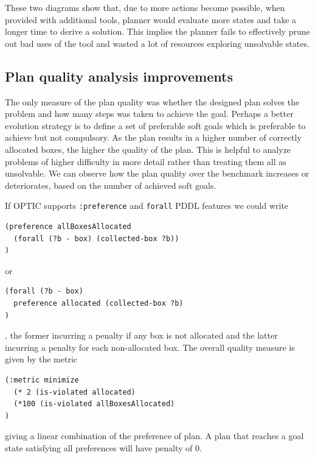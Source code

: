\documentclass[letterpaper]{article} %
\begin{document}
These two diagrams show that, due to more actions become possible, 
when provided with additional tools, planner would evaluate more 
states and take a longer time to derive a solution. This implies 
the planner fails to effectively prune out bad uses of the tool and 
wasted a lot of resources exploring unsolvable states. 
\subsection{Plan quality analysis improvements}
The only measure of the plan quality was whether 
the designed plan solves the problem and how many 
steps was taken to achieve the goal. Perhaps a better 
evolution strategy is to define a set of preferable 
soft goals which is preferable to achieve but not 
compulsory. As the plan results in a higher number 
of correctly allocated boxes, the higher the quality 
of the plan.  This is helpful to analyze problems 
of higher difficulty in more detail rather than 
treating them all as unsolvable. We can observe 
how the plan quality over the benchmark increases 
or deteriorates, based on the number of achieved 
soft goals.  

If OPTIC supports \texttt{:preference} and \texttt{forall}
PDDL features we could write 
\begin{verbatim}
(preference allBoxesAllocated 
  (forall (?b - box) (collected-box ?b))
)  
\end{verbatim}
or 
\begin{verbatim}
(forall (?b - box) 
  preference allocated (collected-box ?b)
)
\end{verbatim}
, the former incurring a penalty if any box is
 not allocated and the latter incurring a 
 penalty for each non-allocated box. 
 The overall quality measure is given by the metric
\begin{verbatim}
(:metric minimize 
  (* 2 (is-violated allocated)
  (*100 (is-violated allBoxesAllocated)
)
\end{verbatim}
 giving a linear combination of the preference of plan. 
 A plan that reaches a goal state satisfying 
 all preferences will have penalty of 0.
 \cite{haslum_2019}



\end{document}

